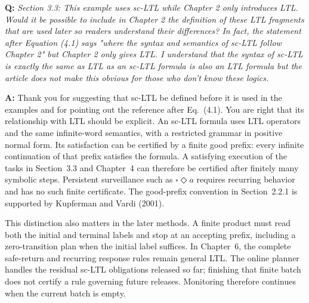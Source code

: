 \documentclass[11pt]{article}
\begin{document}
\begin{shaded*}
\noindent\textbf{Q:} \emph{Section 3.3: This example uses sc-LTL while
Chapter 2 only introduces LTL. Would it be possible to include in Chapter 2 the definition
of these LTL fragments that are used later so readers understand their differences? In
fact, the statement after Equation (4.1) says "where the syntax and semantics of sc-LTL
follow Chapter 2" but Chapter 2 only gives LTL. I understand that the syntax of sc-LTL is
exactly the same as LTL as an sc-LTL formula is also an LTL formula but the article does
not make this obvious for those who don't know these logics.}
\end{shaded*}
\noindent\textbf{A:} Thank you for suggesting that sc-LTL be defined before
it is used in the examples and for pointing out the reference after Eq.~(4.1).
You are right that its relationship with LTL should be explicit. An sc-LTL
formula uses LTL operators and the same infinite-word semantics, with a
restricted grammar in positive normal form. Its satisfaction can be certified
by a finite good prefix: every infinite continuation of that prefix satisfies
the formula. A satisfying execution of the tasks in Section~3.3 and Chapter~4
can therefore be certified after finitely many symbolic steps. Persistent
surveillance such as $\square\Diamond a$ requires recurring behavior and has
no such finite certificate. The good-prefix convention in Section~2.2.1 is
supported by Kupferman and Vardi (2001).

This distinction also matters in the later methods. A finite product must
read both the initial and terminal labels and stop at an accepting prefix,
including a zero-transition plan when the initial label suffices. In Chapter~6,
the complete safe-return and recurring response rules remain general LTL.
The online planner handles the residual sc-LTL obligations released so far;
finishing that finite batch does not certify a rule governing future releases.
Monitoring therefore continues when the current batch is empty.
\end{document}
